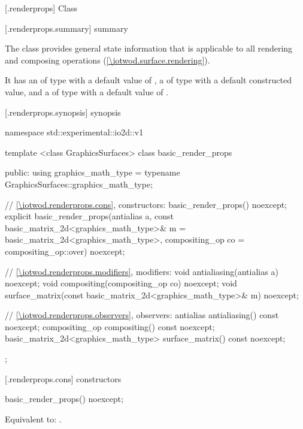 
 [\iotwod.renderprops] {Class }

 [\iotwod.renderprops.summary] { summary}

\pnum
The  class provides general state information that is applicable to all rendering and composing operations (\ref{\iotwod.surface.rendering}).

\pnum
It has an  of type  with a default value of , a  of type  with a default constructed value, and a  of type  with a default value of .

 [\iotwod.renderprops.synopsis] { synopsis}

\begin{codeblock}
namespace std::experimental::io2d::v1 {
  template <class GraphicsSurfaces>
  class basic_render_props {
  public:
    using graphics_math_type = typename GraphicsSurfaces::graphics_math_type;

    // \ref{\iotwod.renderprops.cons}, constructors:
    basic_render_props() noexcept;
    explicit basic_render_props(antialias a,
      const basic_matrix_2d<graphics_math_type>& m = basic_matrix_2d<graphics_math_type>{},
      compositing_op co = compositing_op::over) noexcept;

    // \ref{\iotwod.renderprops.modifiers}, modifiers:
    void antialiasing(antialias a) noexcept;
    void compositing(compositing_op co) noexcept;
    void surface_matrix(const basic_matrix_2d<graphics_math_type>& m) noexcept;

    // \ref{\iotwod.renderprops.observers}, observers:
    antialias antialiasing() const noexcept;
    compositing_op compositing() const noexcept;
    basic_matrix_2d<graphics_math_type> surface_matrix() const noexcept;
  };
}
\end{codeblock}

 [\iotwod.renderprops.cons] { constructors}

\begin{itemdecl}
basic_render_props() noexcept;
\end{itemdecl}
\begin{itemdescr}
\pnum
\effects
Equivalent to: .
\end{itemdescr}

